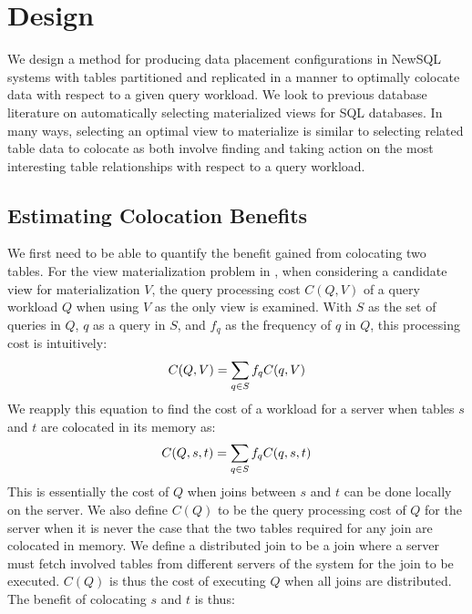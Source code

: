 \section{Design}
\label{sec:design}
We design a method for producing data placement configurations in NewSQL systems with tables partitioned and replicated in a manner to optimally colocate data with respect to a given query workload.  We look to previous database literature on automatically selecting materialized views for SQL databases. In many ways, selecting an optimal view to materialize is similar to selecting related table data to colocate as both involve finding and taking action on the most interesting table relationships with respect to a query workload.

\subsection{Estimating Colocation Benefits}
We first need to be able to quantify the benefit gained from colocating two tables.  For the view materialization problem in \cite{Yang:1997}, when considering a candidate view for materialization $V$, the query processing cost $C(Q,V)$ of a query workload $Q$ when using $V$ as the only view is examined.  With $S$ as the set of queries in $Q$, $q$ as a query in $S$, and $f_q$ as the frequency of $q$ in $Q$, this processing cost is intuitively:
\vspace*{-8pt}
\begin{equation}
C(Q,V) = \sum_{q \in S}f_qC(q,V)
\vspace*{-8pt}
\end{equation}
We reapply this equation to find the cost of a workload for a server when tables $s$ and $t$ are colocated in its memory as:
\begin{equation}
C(Q,s,t) = \sum_{q \in S}f_qC(q,s,t)
\vspace*{-5pt}
\end{equation}
This is essentially the cost of $Q$ when joins between $s$ and $t$ can be done locally on the server.  We also define $C(Q)$ to be the query processing cost of $Q$ for the server when it is never the case that the two tables required for any join are colocated in memory.  We define a distributed join to be a join where a server must fetch involved tables from different servers of the system for the join to be executed.  $C(Q)$ is thus the cost of executing $Q$ when all joins are distributed. The benefit of colocating $s$ and $t$ is thus:
\vspace*{-6pt}
